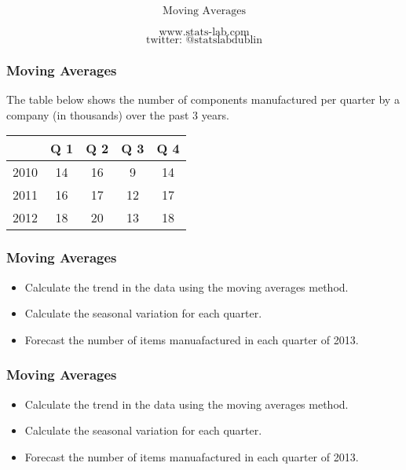 \documentclass{beamer}
\begin{document}
\begin{frame}

{
\Huge
\[\mbox{Moving Averages} \]
}
{
\Large

\[\mbox{www.stats-lab.com} \]
\[ \mbox{twitter: @statslabdublin} \] 

}
\end{frame}

\begin{frame}
\frametitle{Moving Averages}
\Large
The table below shows the number of components manufactured per quarter by a company (in thousands) over the past 3 years.\\
\bigskip
\begin{center}
\begin{tabular}{|c|c|c|c|c|}
\hline  & Q 1  & Q 2  & Q 3 & Q 4 \\ 
\hline  2010 & 14 & 16 & 9 & 14 \\
\hline  2011 &  16 & 17 & 12 & 17 \\ 
\hline  2012 & 18 & 20 & 13 & 18 \\ 
\hline 
\end{tabular} 
\end{center}
\end{frame}

\begin{frame}
\frametitle{Moving Averages}
\Large
\vspace{-1.5cm}
\begin{itemize}
\item Calculate the trend in the data using the moving averages method.
\item Calculate the seasonal variation for each quarter.
\item Forecast the number of items manuafactured in each quarter of 2013.
\end{itemize}
\end{frame}

\begin{frame}
\frametitle{Moving Averages}
\Large
\vspace{-1.5cm}
\begin{itemize}
\item Calculate the trend in the data using the moving averages method.
\item Calculate the seasonal variation for each quarter.
\item Forecast the number of items manuafactured in each quarter of 2013.
\end{itemize}
\end{frame}
\end{document}
